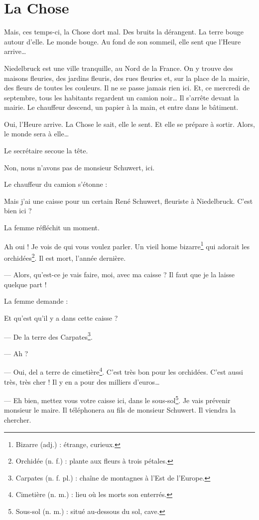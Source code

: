 \chapter{La Chose}
Mais, ces temps-ci, la Chose dort mal. Des bruits la dérangent. La terre bouge autour d'elle. Le monde bouge. Au fond de
son sommeil, elle sent que l'Heure arrive\ldots{}

Niedelbruck est une ville tranquille, au Nord de la France. On y trouve des maisons fleuries, des jardins fleuris,
des rues fleuries et, sur la place de la mairie, des fleurs de toutes les couleurs. Il ne se passe jamais rien ici.
Et, ce mercredi de septembre, tous les habitants regardent un camion noir\ldots{} Il s'arrête devant la mairie. Le
chauffeur descend, un papier à la main, et entre dans le bâtiment.

Oui, l'Heure arrive. La Chose le sait, elle le sent. Et elle se prépare à sortir. Alors, le monde sera à elle\ldots{}

Le secrétaire secoue la tête.

\og{} Non, nous n'avons pas de monsieur Schuwert, ici. \fg{}

Le chauffeur du camion s'étonne :

\og{} Mais j'ai une caisse pour un certain René Schuwert, fleuriste à Niedelbruck. C'est bien ici ? \fg{}

La femme réfléchit un moment.

\og{} Ah oui ! Je vois de qui vous voulez parler. Un vieil home bizarre\footnote{Bizarre (adj.) : étrange, curieux.}
qui adorait les orchidées\footnote{Orchidée (n. f.) : plante aux fleurs à trois pétales.}. Il est mort, l'année
dernière.

--- Alors, qu'est-ce je vais faire, moi, avec ma caisse ? Il faut que je la laisse quelque part ! \fg{}

La femme demande :

\og Et qu'est qu'il y a dans cette caisse ?

--- De la terre des Carpates\footnote{Carpates (n. f. pl.) : chaîne de montagnes à l'Est de l'Europe.}.

--- Ah ?

--- Oui, del a terre de cimetière\footnote{Cimetière (n. m.) : lieu où les morts son enterrés.}. C'est très bon pour
    les orchidées. C'est aussi très, très cher ! Il y en a pour des milliers d'euros\ldots{}

--- Eh bien, mettez vous votre caisse ici, dans le sous-sol\footnote{Sous-sol (n. m.) : situé au-dessous du sol, cave.}.
    Je vais prévenir monsieur le maire. Il téléphonera au fils de monsieur Schuwert. Il viendra la chercher.

